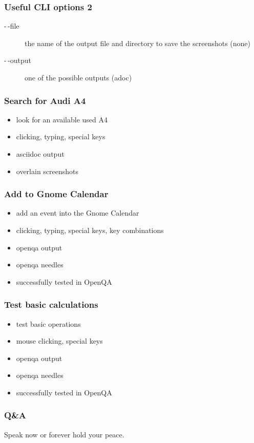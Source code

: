 \documentclass[14pt]{beamer}
\begin{document}
\begin{frame}
	\frametitle{Useful CLI options 2}
	\begin{description}
		\item[{\color{blue}-\,-file}] the name of the output file and directory to save the screenshots (none)
		\item[{\color{blue}-\,-output}] one of the possible outputs (adoc) 
	\end{description}
\end{frame}

\begin{frame}
	\frametitle{Search for Audi A4}
	\begin{itemize}
		\item look for an available used A4
		\item clicking, typing, special keys
		\item asciidoc output
		\item overlain screenshots
	\end{itemize}	
\end{frame}

\begin{frame}
	\frametitle{Add to Gnome Calendar}
	\begin{itemize}
	\item add an event into the Gnome Calendar
	\item clicking, typing, special keys, key combinations
	\item openqa output
	\item openqa needles
	\item successfully tested in OpenQA
\end{itemize}	
\end{frame}

\begin{frame}
	\frametitle{Test basic calculations}
	\begin{itemize}
		\item test basic operations
		\item mouse clicking, special keys
		\item openqa output
		\item openqa needles
		\item successfully tested in OpenQA
	\end{itemize}	
\end{frame}

\begin{frame}
	\frametitle{Q\&A}
	Speak now or forever hold your peace.
\end{frame}
\end{document}
